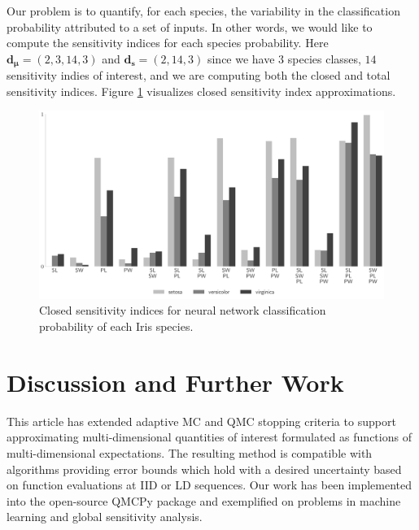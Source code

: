 \documentclass[graybox]{svmult}
\begin{document}
Our problem is to quantify, for each species, the variability in the classification probability attributed to a set of inputs. In other words, we would like to compute the sensitivity indices for each species probability. 
Here $\boldsymbol{d}_{\boldsymbol{\mu}} = (2,3,14,3)$ and $\boldsymbol{d}_{\boldsymbol{s}} = (2,14,3)$ since we have $3$ species classes, $14$ sensitivity indies of interest, and we are computing both the closed and total sensitivity indices. Figure \ref{SoRa_fig:nn_si} visualizes closed sensitivity index approximations. 
%

\begin{figure}[t]
    \centering
    \includegraphics[width=.8\textwidth]{figs/nn_si.pdf}
    \caption{Closed sensitivity indices for neural network classification probability of each Iris species.}
    \label{SoRa_fig:nn_si}
\end{figure}

\section{Discussion and Further Work} \label{SoRa_sec:conclusions}

This article has extended adaptive MC and QMC stopping criteria to support approximating multi-dimensional quantities of interest formulated as functions of multi-dimensional expectations. The resulting method is compatible with algorithms providing error bounds which hold with a desired uncertainty based on function evaluations at IID or LD sequences. Our work has been implemented into the open-source QMCPy package and exemplified on problems in machine learning and global sensitivity analysis. 
\end{document}

